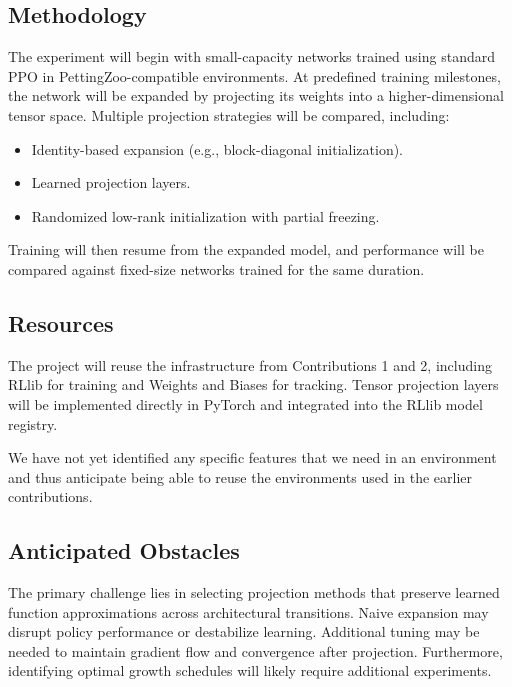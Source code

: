\subsection{Methodology}
The experiment will begin with small-capacity networks trained using standard 
PPO in PettingZoo-compatible environments. At predefined training milestones, 
the network will be expanded by projecting its weights into a higher-dimensional tensor space. 
Multiple projection strategies will be compared, including:
\begin{itemize}
    \item Identity-based expansion (e.g., block-diagonal initialization).
    \item Learned projection layers.
    \item Randomized low-rank initialization with partial freezing.
\end{itemize}
Training will then resume from the expanded model, and performance will 
be compared against fixed-size networks trained for the same duration.

\subsection{Resources}
The project will reuse the infrastructure from Contributions 1 and 2, 
including RLlib for training and Weights and Biases for tracking. 
Tensor projection layers will be implemented directly in PyTorch and 
integrated into the RLlib model registry.

We have not yet identified any specific features that we need in an environment
and thus anticipate being able to reuse the environments used in the 
earlier contributions.

\subsection{Anticipated Obstacles}
The primary challenge lies in selecting projection methods that preserve 
learned function approximations across architectural transitions. 
Naive expansion may disrupt policy performance or destabilize learning. 
Additional tuning may be needed to maintain gradient flow and convergence 
after projection. Furthermore, identifying optimal growth schedules will 
likely require additional experiments.

